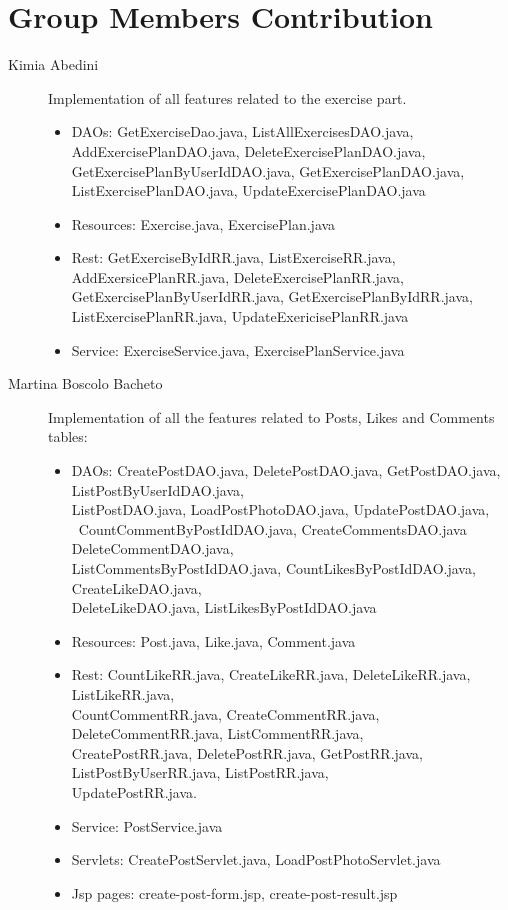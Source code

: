 \section{Group Members Contribution}


\begin{description}
\item[Kimia Abedini] Implementation of all features related to the exercise part.
    \begin{itemize}
        \item DAOs: GetExerciseDao.java, ListAllExercisesDAO.java, AddExercisePlanDAO.java, DeleteExercisePlanDAO.java,
       GetExercisePlanByUserIdDAO.java, GetExercisePlanDAO.java, ListExercisePlanDAO.java, UpdateExercisePlanDAO.java
        \item Resources: Exercise.java, ExercisePlan.java
        \item Rest: GetExerciseByIdRR.java, ListExerciseRR.java, AddExersicePlanRR.java, DeleteExercisePlanRR.java, GetExercisePlanByUserIdRR.java, GetExercisePlanByIdRR.java, ListExercisePlanRR.java, UpdateExericisePlanRR.java
        \item Service: ExerciseService.java, ExercisePlanService.java
    \end{itemize}
 
\item[Martina Boscolo Bacheto] Implementation of all the features related to Posts, Likes and Comments tables:
    \begin{itemize}
        \item DAOs: CreatePostDAO.java, DeletePostDAO.java, GetPostDAO.java, ListPostByUserIdDAO.java, \\
        ListPostDAO.java,  LoadPostPhotoDAO.java, UpdatePostDAO.java, \\\ CountCommentByPostIdDAO.java, CreateCommentsDAO.java DeleteCommentDAO.java, \\ ListCommentsByPostIdDAO.java, CountLikesByPostIdDAO.java, CreateLikeDAO.java, \\ DeleteLikeDAO.java, ListLikesByPostIdDAO.java
        \item Resources: Post.java, Like.java, Comment.java 
        \item Rest: CountLikeRR.java, CreateLikeRR.java, DeleteLikeRR.java, ListLikeRR.java,\\
        CountCommentRR.java, CreateCommentRR.java, DeleteCommentRR.java, ListCommentRR.java, \\ CreatePostRR.java, 
        DeletePostRR.java, GetPostRR.java, 
        ListPostByUserRR.java, ListPostRR.java, \\
        UpdatePostRR.java.
        \item Service: PostService.java
        \item Servlets: CreatePostServlet.java, LoadPostPhotoServlet.java
        \item Jsp pages: create-post-form.jsp, create-post-result.jsp    
    \end{itemize}
    

\end{description}
